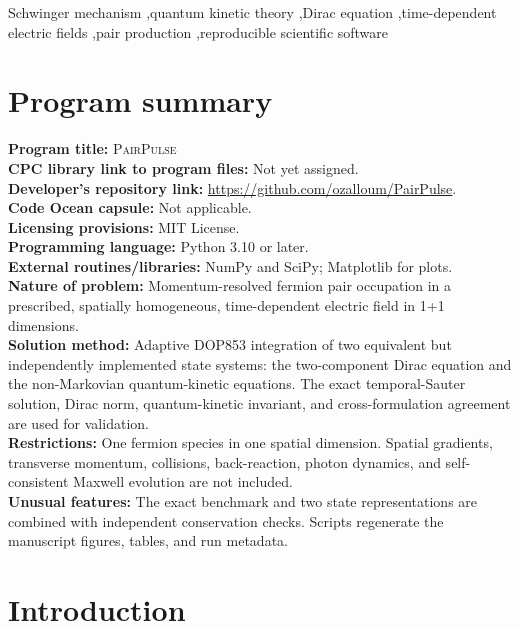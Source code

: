 \documentclass[a4paper,fleqn]{cas-dc}
\newcommand{\PairPulse}{\textsc{PairPulse}}
\begin{document}
\begin{keywords}
Schwinger mechanism \sep quantum kinetic theory \sep Dirac equation \sep time-dependent electric fields \sep pair production \sep reproducible scientific software
\end{keywords}

\maketitle
\linenumbers

\section*{Program summary}
\noindent\textbf{Program title:} \PairPulse\\
\textbf{CPC library link to program files:} Not yet assigned.\\
\textbf{Developer's repository link:} \url{https://github.com/ozalloum/PairPulse}.\\
\textbf{Code Ocean capsule:} Not applicable.\\
\textbf{Licensing provisions:} MIT License.\\
\textbf{Programming language:} Python 3.10 or later.\\
\textbf{External routines/libraries:} NumPy and SciPy; Matplotlib for plots.\\
\textbf{Nature of problem:} Momentum-resolved fermion pair occupation in a prescribed, spatially homogeneous, time-dependent electric field in 1+1 dimensions.\\
\textbf{Solution method:} Adaptive DOP853 integration of two equivalent but independently implemented state systems: the two-component Dirac equation and the non-Markovian quantum-kinetic equations. The exact temporal-Sauter solution, Dirac norm, quantum-kinetic invariant, and cross-formulation agreement are used for validation.\\
\textbf{Restrictions:} One fermion species in one spatial dimension. Spatial gradients, transverse momentum, collisions, back-reaction, photon dynamics, and self-consistent Maxwell evolution are not included.\\
\textbf{Unusual features:} The exact benchmark and two state representations are combined with independent conservation checks. Scripts regenerate the manuscript figures, tables, and run metadata.

\section{Introduction}
\end{document}
